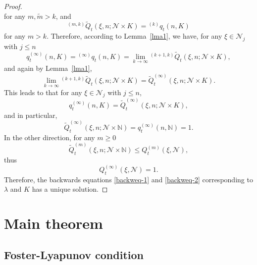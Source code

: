 \documentclass[12pt]{article}
\newcommand{\leftsup}[2]{{}^{#1}\! #2}%
\newcommand{\N}{\mathbb{N}}
\newcounter{con}%
\numberwithin{equation}{section}
\begin{document}
\begin{proof}
\begin{equation}
\end{equation}
for any $m,\tilde{m}>k$,
and
\begin{equation}
	\leftsup{(m,k)}{\tilde{Q}}_t(\xi,n;\mathcal{N}\times K)=\leftsup{(k)}{q}_t(n,K)
\end{equation}
for any $m>k$.
Therefore, according to Lemma~\ref{lma1}, we have, for any $\xi\in\mathcal{N}_j$ with $j\le n$
\begin{equation}
	q^{(\infty)}_t(n,K)=\leftsup{(\infty)}{q}_t(n,K)=\lim_{k\to\infty}\leftsup{(k+1,k)}{\tilde{Q}}_t(\xi,n;\mathcal{N}\times K),
\end{equation}
and again by Lemma~\ref{lma1}, %
\begin{equation}
  \lim_{k\to\infty}\leftsup{(k+1,k)}{\tilde{Q}}_t(\xi,n;\mathcal{N}\times K)
  =\tilde{Q}^{(\infty)}_t(\xi,n;\mathcal{N}\times K).
\end{equation}
This leads to that 
for any $\xi\in\mathcal{N}_j$ with $j\le n$,
\begin{equation}
	q^{(\infty)}_t(n,K)=\tilde{Q}^{(\infty)}_t(\xi,n;\mathcal{N}\times K),
\end{equation}
and in particular, 
\begin{equation}
	\tilde{Q}^{(\infty)}_t(\xi,n;\mathcal{N}\times\N)=q^{(\infty)}_t(n,\N)=1.
\end{equation}
In the other direction, 
for any $m\ge0$
\begin{equation}
	\tilde{Q}^{(m)}_t(\xi,n;\mathcal{N}\times\N)\le Q^{(m)}_t(\xi,\mathcal{N}),
\end{equation}
thus 
\begin{equation}
	Q^{(\infty)}_t(\xi,\mathcal{N})=1.
\end{equation}
Therefore, the backwards equations \eqref{backweq-1} and \eqref{backweq-2} corresponding to $\lambda$ and $K$ has a unique solution.
\end{proof}


\section{Main theorem}
\subsection{Foster-Lyapunov condition}\label{sec:foster}
\end{document}
